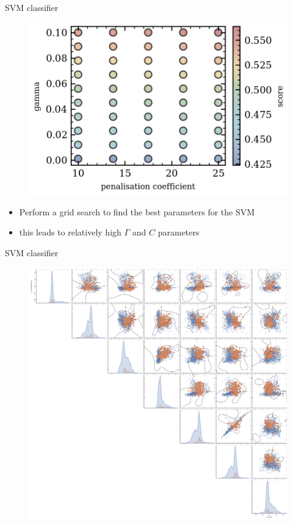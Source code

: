 \documentclass[numbering=fraction]{beamer}
\begin{document}
\begin{frame}{SVM classifier}
    \begin{figure}[H]
        \centering
        \includegraphics[width=0.6\linewidth]{figure/grid_search.png}
    \end{figure}
    \begin{itemize}
        \item Perform a grid search to find the best parameters for the SVM
        \item this leads to relatively high $\Gamma$ and $C$ parameters
    \end{itemize}
\end{frame}
\begin{frame}{SVM classifier}
    \begin{figure}[H]
        \centering
        \includegraphics[height=0.6\linewidth]{figure/decision.png}
    \end{figure}
\end{frame}
\end{document}
